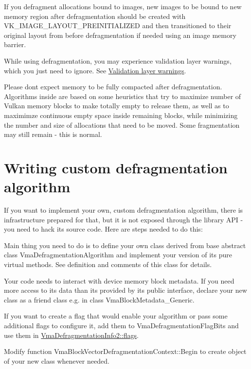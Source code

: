 If you defragment allocations bound to images, new images to be bound to new memory region after defragmentation should be created with {\ttfamily V\+K\+\_\+\+I\+M\+A\+G\+E\+\_\+\+L\+A\+Y\+O\+U\+T\+\_\+\+P\+R\+E\+I\+N\+I\+T\+I\+A\+L\+I\+Z\+ED} and then transitioned to their original layout from before defragmentation if needed using an image memory barrier.

While using defragmentation, you may experience validation layer warnings, which you just need to ignore. See \hyperlink{general_considerations_general_considerations_validation_layer_warnings}{Validation layer warnings}.

Please don\textquotesingle{}t expect memory to be fully compacted after defragmentation. Algorithms inside are based on some heuristics that try to maximize number of Vulkan memory blocks to make totally empty to release them, as well as to maximimze continuous empty space inside remaining blocks, while minimizing the number and size of allocations that need to be moved. Some fragmentation may still remain -\/ this is normal.\hypertarget{defragmentation_defragmentation_custom_algorithm}{}\section{Writing custom defragmentation algorithm}\label{defragmentation_defragmentation_custom_algorithm}
If you want to implement your own, custom defragmentation algorithm, there is infrastructure prepared for that, but it is not exposed through the library A\+PI -\/ you need to hack its source code. Here are steps needed to do this\+:


\begin{DoxyEnumerate}
\item Main thing you need to do is to define your own class derived from base abstract class {\ttfamily Vma\+Defragmentation\+Algorithm} and implement your version of its pure virtual methods. See definition and comments of this class for details.
\item Your code needs to interact with device memory block metadata. If you need more access to its data than it\textquotesingle{}s provided by its public interface, declare your new class as a friend class e.\+g. in class {\ttfamily Vma\+Block\+Metadata\+\_\+\+Generic}.
\item If you want to create a flag that would enable your algorithm or pass some additional flags to configure it, add them to {\ttfamily Vma\+Defragmentation\+Flag\+Bits} and use them in \hyperlink{structVmaDefragmentationInfo2_a53e844ee5633e229cf6daf14b2d9fff9}{Vma\+Defragmentation\+Info2\+::flags}.
\item Modify function {\ttfamily Vma\+Block\+Vector\+Defragmentation\+Context\+::\+Begin} to create object of your new class whenever needed. 
\end{DoxyEnumerate}
